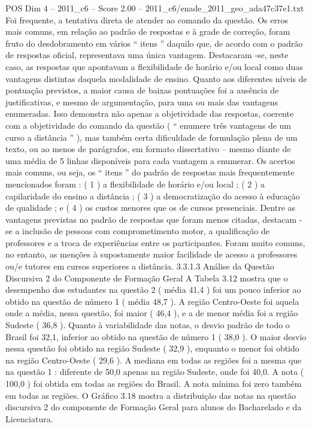 \begin{textsample}{POS Dim 4 – 2011\_c6 – Score 2.00 – 2011\_c6/enade\_2011\_geo\_ada47c37e1.txt}
Foi frequente, a tentativa direta de atender ao comando da questão.
Os erros mais comuns, em relação ao padrão de respostas e à grade de correção, foram fruto do desdobramento em vários “ itens ” daquilo que, de acordo com o padrão de respostas oficial, representava uma única vantagem.
Destacaram -se, neste caso, as respostas que apontavam a flexibilidade de horário e/ou local como duas vantagens distintas daquela modalidade de ensino.
Quanto aos diferentes níveis de pontuação previstos, a maior causa de baixas pontuações foi a ausência de justificativas, e mesmo de argumentação, para uma ou mais das vantagens enumeradas.
Isso demonstra não apenas a objetividade das respostas, coerente com a objetividade do comando da questão ( “ enumere três vantagens de um curso a distância ” ), mas também certa dificuldade de formulação plena de um texto, ou ao menos de parágrafos, em formato dissertativo – mesmo diante de uma média de 5 linhas disponíveis para cada vantagem a enumerar.
Os acertos mais comuns, ou seja, os “ itens ” do padrão de respostas mais frequentemente mencionados foram : ( 1 ) a flexibilidade de horário e/ou local ; ( 2 ) a capilaridade do ensino a distância ; ( 3 ) a democratização do acesso à educação de qualidade ; e ( 4 ) os custos menores que os de cursos presenciais.
Dentre as vantagens previstas no padrão de respostas que foram menos citadas, destacam -se a inclusão de pessoas com comprometimento motor, a qualificação de professores e a troca de experiências entre os participantes.
Foram muito comuns, no entanto, as menções à supostamente maior facilidade de acesso a professores ou/e tutores em cursos superiores a distância. 3.3.1.3 Análise da Questão Discursiva 2 do Componente de Formação Geral A Tabela 3.12 mostra que o desempenho dos estudantes na questão 2 ( média 41,4 ) foi um pouco inferior ao obtido na questão de número 1 ( média 48,7 ).
A região Centro-Oeste foi aquela onde a média, nessa questão, foi maior ( 46,4 ), e a de menor média foi a região Sudeste ( 36,8 ).
Quanto à variabilidade das notas, o desvio padrão de todo o Brasil foi 32,1, inferior ao obtido na questão de número 1 ( 38,0 ).
O maior desvio nessa questão foi obtido na região Sudeste ( 32,9 ), enquanto o menor foi obtido na região Centro-Oeste ( 29,6 ).
A mediana em todas as regiões foi a mesma que na questão 1 : diferente de 50,0 apenas na região Sudeste, onde foi 40,0.
A nota ( 100,0 ) foi obtida em todas as regiões do Brasil.
A nota mínima foi zero também em todas as regiões.
O Gráfico 3.18 mostra a distribuição das notas na questão discursiva 2 do componente de Formação Geral para alunos do Bacharelado e da Licenciatura.

\end{textsample}
